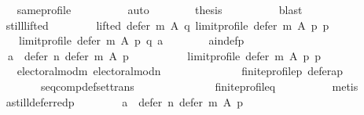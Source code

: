 \begin{isabellebody}
\ \ \ \ \ \ \ \ \isamarkupfalse%
\ same{\isacharunderscore}{\kern0pt}profile\isanewline
\ \ \ \ \ \ \ \ \isamarkupfalse%
\ auto\isanewline
\ \ \ \ \ \ \isamarkupfalse%
\ {\isacharquery}{\kern0pt}thesis\isanewline
\ \ \ \ \ \ \ \ \isamarkupfalse%
\ blast\isanewline
\ \ \ \ \isamarkupfalse%
\isanewline
\ \ \ \ \ \ \isamarkupfalse%
\ still{\isacharunderscore}{\kern0pt}lifted{\isacharcolon}{\kern0pt}\isanewline
\ \ \ \ \ \ \ \ {\isachardoublequoteopen}lifted\ {\isacharparenleft}{\kern0pt}defer\ m\ A\ q{\isacharparenright}{\kern0pt}\ {\isacharparenleft}{\kern0pt}limit{\isacharunderscore}{\kern0pt}profile\ {\isacharparenleft}{\kern0pt}defer\ m\ A\ p{\isacharparenright}{\kern0pt}\ p{\isacharparenright}{\kern0pt}\isanewline
\ \ \ \ \ \ \ \ \ \ {\isacharparenleft}{\kern0pt}limit{\isacharunderscore}{\kern0pt}profile\ {\isacharparenleft}{\kern0pt}defer\ m\ A\ p{\isacharparenright}{\kern0pt}\ q{\isacharparenright}{\kern0pt}\ a{\isachardoublequoteclose}\isanewline
\ \ \ \ \ \ \isamarkupfalse%
\ a{\isacharunderscore}{\kern0pt}in{\isacharunderscore}{\kern0pt}def{\isacharunderscore}{\kern0pt}p{\isacharcolon}{\kern0pt}\isanewline
\ \ \ \ \ \ \ \ {\isachardoublequoteopen}a\ {\isasymin}\ defer\ n\ {\isacharparenleft}{\kern0pt}defer\ m\ A\ p{\isacharparenright}{\kern0pt}\isanewline
\ \ \ \ \ \ \ \ \ \ {\isacharparenleft}{\kern0pt}limit{\isacharunderscore}{\kern0pt}profile\ {\isacharparenleft}{\kern0pt}defer\ m\ A\ p{\isacharparenright}{\kern0pt}\ p{\isacharparenright}{\kern0pt}{\isachardoublequoteclose}\isanewline
\ \ \ \ \ \ \ \ \isamarkupfalse%
\ electoral{\isacharunderscore}{\kern0pt}mod{\isacharunderscore}{\kern0pt}m\ electoral{\isacharunderscore}{\kern0pt}mod{\isacharunderscore}{\kern0pt}n\isanewline
\ \ \ \ \ \ \ \ \ \ \ \ \ \ finite{\isacharunderscore}{\kern0pt}profile{\isacharunderscore}{\kern0pt}p\ defer{\isacharunderscore}{\kern0pt}a{\isacharunderscore}{\kern0pt}p\isanewline
\ \ \ \ \ \ \ \ \ \ \ \ \ \ seq{\isacharunderscore}{\kern0pt}comp{\isacharunderscore}{\kern0pt}def{\isacharunderscore}{\kern0pt}set{\isacharunderscore}{\kern0pt}trans\isanewline
\ \ \ \ \ \ \ \ \ \ \ \ \ \ finite{\isacharunderscore}{\kern0pt}profile{\isacharunderscore}{\kern0pt}q\isanewline
\ \ \ \ \ \ \ \ \isamarkupfalse%
\ metis\isanewline
\ \ \ \ \ \ \isamarkupfalse%
\ a{\isacharunderscore}{\kern0pt}still{\isacharunderscore}{\kern0pt}deferred{\isacharunderscore}{\kern0pt}p{\isacharcolon}{\kern0pt}\isanewline
\ \ \ \ \ \ \ \ {\isachardoublequoteopen}{\isacharbraceleft}{\kern0pt}a{\isacharbraceright}{\kern0pt}\ {\isasymsubseteq}\ defer\ n\ {\isacharparenleft}{\kern0pt}defer\ m\ A\ p{\isacharparenright}{\kern0pt}\isanewline

\end{isabellebody}
